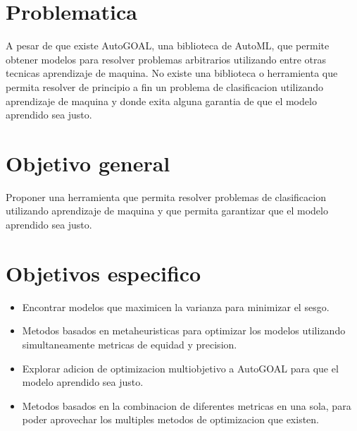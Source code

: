 \section*{Problematica}

A pesar de que existe AutoGOAL, una biblioteca de AutoML, que permite obtener modelos para resolver problemas arbitrarios utilizando entre otras tecnicas aprendizaje de maquina. No existe una biblioteca o herramienta que permita resolver de principio a fin un problema de clasificacion utilizando aprendizaje de maquina y donde exita alguna garantia de que el modelo aprendido sea justo.

\section*{Objetivo general}

Proponer una herramienta que permita resolver problemas de clasificacion utilizando aprendizaje de maquina y que permita garantizar que el modelo aprendido sea justo.

\section*{Objetivos especifico}

\begin{itemize}
    \item Encontrar modelos que maximicen la varianza para minimizar el sesgo.
    \item Metodos basados en metaheuristicas para optimizar los modelos utilizando simultaneamente metricas de equidad y precision.
    \item Explorar adicion de optimizacion multiobjetivo a AutoGOAL para que el modelo aprendido sea justo.
    \item Metodos basados en la combinacion de diferentes metricas en una sola, para poder aprovechar los multiples metodos de optimizacion que existen.
\end{itemize}
